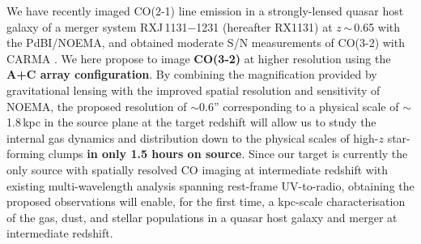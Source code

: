 \documentclass[11pt,a4paper,twoside,graphicx,color]{article}
\newcommand{\bco}{\mbox{CO(2-1)}\xspace}
\newcommand{\cco}{\mbox{CO(3-2)}\xspace}
\newcommand{\Fig}[1]{Fig.~\ref{fig:#1}}
\newcommand{\ssim}{\,$\sim$\,}
\newcommand{\mulw}{multi-wavelength\xspace}
\newcommand{\highz}{high-$z$\xspace}
\newcommand{\obs}{observations\xspace}
\begin{document}
We have recently imaged \bco line emission
in a strongly-lensed quasar host galaxy of a merger system 
 RXJ\,1131$-$1231 (hereafter RX1131) at $z$\ssim0.65
with the PdBI/NOEMA, and obtained moderate S/N measurements
of \cco with CARMA \citep[\Fig{combine};][]{Leung16b}. 
We here propose to image {\bf \cco} 
at higher resolution using the {\bf A+C array configuration}.
By combining the magnification provided by gravitational lensing with the improved spatial resolution and sensitivity of NOEMA, 
the proposed resolution of $\sim$0.6''
corresponding to a physical scale of $\sim$1.8\,kpc in the source plane at the target redshift
will allow us to study the internal gas dynamics and distribution 
down to the physical scales of \highz star-forming clumps {\bf in only 1.5 hours on source}.
Since our target is currently the only source with spatially resolved CO
imaging at intermediate redshift with existing \mulw analysis spanning rest-frame
UV-to-radio, obtaining the proposed \obs will enable, for the first time, a kpc-scale characterisation of the gas, dust, and stellar populations in a quasar host galaxy and merger at intermediate redshift.
\end{document}
